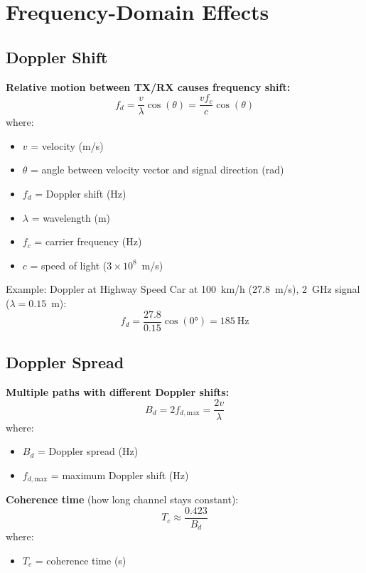 \section{Frequency-Domain Effects}

\subsection{Doppler Shift}

\textbf{Relative motion between TX/RX causes frequency shift:}
\begin{equation}
f_d = \frac{v}{\lambda} \cos(\theta) = \frac{v f_c}{c} \cos(\theta)
\label{eq:doppler-shift}
\end{equation}
where:
\begin{itemize}
\item $v$ = velocity (m/s)
\item $\theta$ = angle between velocity vector and signal direction (rad)
\item $f_d$ = Doppler shift (Hz)
\item $\lambda$ = wavelength (m)
\item $f_c$ = carrier frequency (Hz)
\item $c$ = speed of light ($3 \times 10^8$~m/s)
\end{itemize}

\begin{calloutbox}{Example: Doppler at Highway Speed}
Car at 100~km/h (27.8~m/s), 2~GHz signal ($\lambda = 0.15$~m):
\begin{equation*}
f_d = \frac{27.8}{0.15} \cos(0°) = 185~\text{Hz}
\end{equation*}
\end{calloutbox}

\subsection{Doppler Spread}

\textbf{Multiple paths with different Doppler shifts:}
\begin{equation}
B_d = 2f_{d,\text{max}} = \frac{2v}{\lambda}
\label{eq:doppler-spread}
\end{equation}
where:
\begin{itemize}
\item $B_d$ = Doppler spread (Hz)
\item $f_{d,\text{max}}$ = maximum Doppler shift (Hz)
\end{itemize}

\textbf{Coherence time} (how long channel stays constant):
\begin{equation}
T_c \approx \frac{0.423}{B_d}
\label{eq:coherence-time}
\end{equation}
where:
\begin{itemize}
\item $T_c$ = coherence time (s)
\end{itemize}

